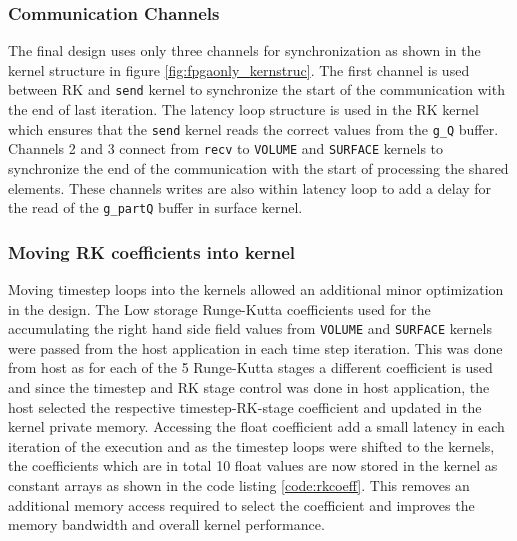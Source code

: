 \subsubsection*{Communication Channels}

The final design uses only three channels for synchronization as shown in the kernel
structure in figure \ref{fig:fpgaonly_kernstruc}. The first channel is used between RK and
\texttt{send} kernel to synchronize the start of the communication with the end of last iteration.
The latency loop structure is used in the RK kernel which ensures that the \texttt{send}
kernel reads the correct values from the \texttt{g\_Q} buffer. Channels 2 and 3 connect from
\texttt{recv} to \texttt{VOLUME} and \texttt{SURFACE} kernels to synchronize the end of the
communication with the start of processing the shared elements. These channels writes are also within
latency loop to add a delay for the read of the \texttt{g\_partQ} buffer in surface kernel.

\subsubsection*{Moving RK coefficients into kernel}
Moving timestep loops into the kernels allowed an additional minor optimization in the design.
The Low storage Runge-Kutta coefficients used for the accumulating the right hand side field values from
\texttt{VOLUME} and \texttt{SURFACE} kernels were passed from the host application in each time step
iteration. This was done from host as for each of the 5 Runge-Kutta stages a different coefficient is used
and since the timestep and RK stage control was done in host application, the host selected the respective
timestep-RK-stage coefficient and updated in the kernel private memory. Accessing the float coefficient
add a small latency in each iteration of the execution and as the timestep loops were shifted to the kernels,
the coefficients which are in total 10 float values are now stored in the kernel as constant arrays as shown
in the code listing \ref{code:rkcoeff}. This removes an additional memory access required to select the
coefficient and improves the memory bandwidth and overall kernel performance.

